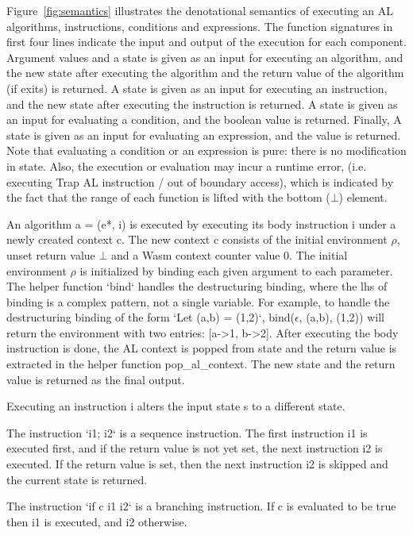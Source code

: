 Figure~\ref{fig:semantics} illustrates the denotational semantics of executing an AL algorithms, instructions,
conditions and expressions. The function signatures in first four lines
indicate the input and output of the execution for each component.
Argument values and a state is given as an input for executing an algorithm,
and the new state after executing the algorithm and the return value of the algorithm (if exits) is returned.
A state is given as an input for executing an instruction,
and the new state after executing the instruction is returned.
A state is given as an input for evaluating a condition, and the boolean value is returned.
Finally, A state is given as an input for evaluating an expression, and the value is returned.
Note that evaluating a condition or an expression is pure: there is no modification in state.
Also, the execution or evaluation may incur a runtime error, (i.e. executing Trap AL instruction
/ out of boundary access), which is indicated by the fact that the range of each function
is lifted with the bottom ($\bot$) element.

An algorithm a = (e*, i) is executed by executing its body instruction i under a newly created context c.
The new context c consists of the initial environment $\rho$, unset return value $\bot$ and a
Wasm context counter value 0. The initial environment $\rho$ is initialized by binding
each given argument to each parameter. The helper function `bind` handles the
destructuring binding, where the lhs of binding is a complex pattern, not a single variable.
For example, to handle the destructuring binding of the form `Let (a,b) = (1,2)`,
bind($\epsilon$, (a,b), (1,2)) will return the environment with two entries: [a->1, b->2].
After executing the body instruction is done, the AL context is popped from state and
the return value is extracted in the helper function pop\_al\_context. The new state
and the return value is returned as the final output.

Executing an instruction i alters the input state s to a different state.

The instruction `i1; i2` is a sequence instruction. The first instruction
i1 is executed first, and if the return value is not yet set, the next instruction
i2 is executed. If the return value is set, then the next instruction i2 is skipped and
the current state is returned.

The instruction `if c i1 i2` is a branching instruction. If c is evaluated to be true then
i1 is executed, and i2 otherwise.

